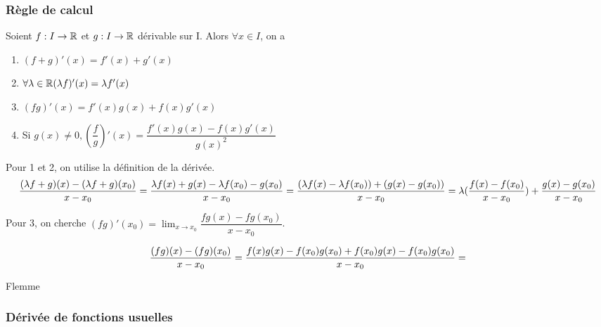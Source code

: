 \documentclass[a4paper, 12pt]{article}
\begin{document}
\subsubsection{Règle de calcul}

\begin{proprietes}
    Soient $f: I \rightarrow \mathbb{R}$ et $g: I \rightarrow \mathbb{R}$ dérivable sur I.
    Alors $\forall x \in I$, on a
    \begin{enumerate}
        \item $(f + g)'(x) = f'(x) + g'(x)$
        \item $\forall \lambda \in \mathbb{R} (\lambda f)'(x) = \lambda f'(x)$
        \item $(fg)'(x) = f'(x)g(x) + f(x)g'(x)$
        \item Si $g(x) \neq 0, (\dfrac{f}{g})'(x) = \dfrac{f'(x)g(x) - f(x)g'(x)}{g(x)^2}$
    \end{enumerate}
\end{proprietes}

\begin{demonstration}
    Pour 1 et 2, on utilise la définition de la dérivée.
    $$
    \dfrac{(\lambda f + g)(x) - (\lambda f + g)(x_0)}{x - x_0} \\
    = \dfrac{\lambda f(x) + g(x) - \lambda f(x_0) - g(x_0)}{x - x_0} \\
    = \dfrac{(\lambda f(x) - \lambda f(x_0)) + (g(x) - g(x_0))}{x - x_0} \\
    = \lambda (\dfrac{f(x) - f(x_0)}{x - x_0}) + \dfrac{g(x) - g(x_0)}{x - x_0}
    $$
    
    Pour 3, on cherche
    $(fg)'(x_0) = \lim_{x \to x_0}\dfrac{fg(x) - fg(x_0)}{x - x_0}$.
    
    $$
    \dfrac{(fg)(x) - (fg)(x_0)}{x - x_0} = \dfrac{f(x)g(x) - f(x_0)g(x_0) + f(x_0)g(x) - f(x_0)g(x_0)}{x - x_0} \\
    = %
    $$
    
    Flemme
\end{demonstration}

\subsubsection{Dérivée de fonctions usuelles}
\end{document}
